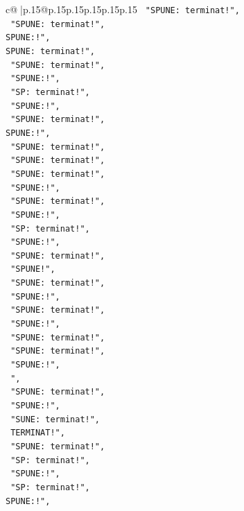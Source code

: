 \documentclass{article}
\begin{document}
{\begin{supertabular}{c@{$\;$}|p{.15\linewidth}@{}p{.15\linewidth}p{.15\linewidth}p{.15\linewidth}p{.15\linewidth}p{.15\linewidth}}
{{{\texttt{    "SPUNE: terminat!",} \\
\texttt{    "SPUNE: terminat!",} \\
\texttt{SPUNE:!",} \\
\texttt{SPUNE: terminat!",} \\
\texttt{    "SPUNE: terminat!",} \\
\texttt{    "SPUNE:!",} \\
\texttt{    "SP: terminat!",} \\
\texttt{    "SPUNE:!",} \\
\texttt{    "SPUNE: terminat!",} \\
\texttt{SPUNE:!",} \\
\texttt{    "SPUNE: terminat!",} \\
\texttt{    "SPUNE: terminat!",} \\
\texttt{    "SPUNE: terminat!",} \\
\texttt{    "SPUNE:!",} \\
\texttt{    "SPUNE: terminat!",} \\
\texttt{    "SPUNE:!",} \\
\texttt{    "SP: terminat!",} \\
\texttt{    "SPUNE:!",} \\
\texttt{    "SPUNE: terminat!",} \\
\texttt{    "SPUNE!",} \\
\texttt{    "SPUNE: terminat!",} \\
\texttt{    "SPUNE:!",} \\
\texttt{    "SPUNE: terminat!",} \\
\texttt{    "SPUNE:!",} \\
\texttt{    "SPUNE: terminat!",} \\
\texttt{    "SPUNE: terminat!",} \\
\texttt{    "SPUNE:!",} \\
\texttt{   ",} \\
\texttt{    "SPUNE: terminat!",} \\
\texttt{    "SPUNE:!",} \\
\texttt{    "SUNE: terminat!",} \\
\texttt{    TERMINAT!",} \\
\texttt{    "SPUNE: terminat!",} \\
\texttt{    "SP: terminat!",} \\
\texttt{    "SPUNE:!",} \\
\texttt{    "SP: terminat!",} \\
\texttt{SPUNE:!",} \\
}}}
\end{supertabular}}
\end{document}

